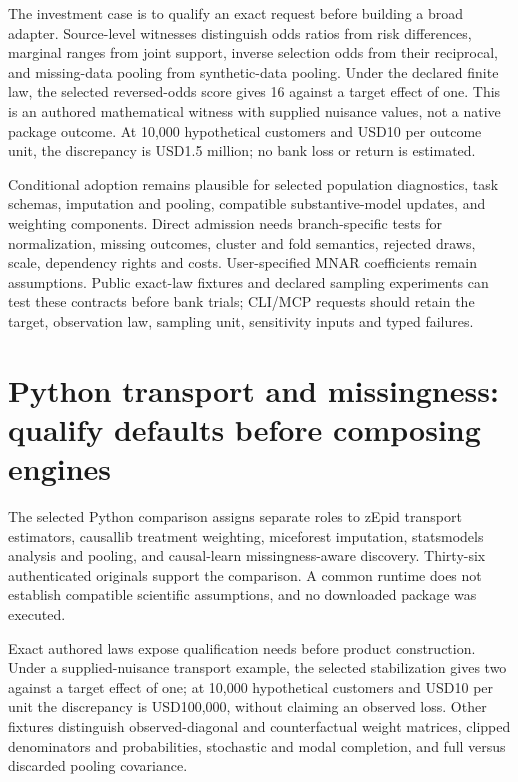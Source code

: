 The investment case is to qualify an exact request before building a
broad adapter. Source-level witnesses distinguish odds ratios from risk
differences, marginal ranges from joint support, inverse selection odds
from their reciprocal, and missing-data pooling from synthetic-data
pooling. Under the declared finite law, the selected reversed-odds score
gives 16 against a target effect of one. This is an authored
mathematical witness with supplied nuisance values, not a native package
outcome. At 10,000 hypothetical customers and USD10 per outcome unit,
the discrepancy is USD1.5 million; no bank loss or return is estimated.
\citep{exec25_rtm_choice}

Conditional adoption remains plausible for selected population
diagnostics, task schemas, imputation and pooling, compatible
substantive-model updates, and weighting components. Direct admission
needs branch-specific tests for normalization, missing outcomes, cluster
and fold semantics, rejected draws, scale, dependency rights and costs.
User-specified MNAR coefficients remain assumptions. Public exact-law
fixtures and declared sampling experiments can test these contracts
before bank trials; CLI/MCP requests should retain the target,
observation law, sampling unit, sensitivity inputs and typed failures.
\citep{exec25_rtm_choice}

\hypertarget{python-transport-and-missingness-qualify-defaults-before-composing-engines}{%
\section{Python transport and missingness: qualify defaults before
composing
engines}\label{python-transport-and-missingness-qualify-defaults-before-composing-engines}}

The selected Python comparison assigns separate roles to zEpid transport
estimators, causallib treatment weighting, miceforest imputation,
statsmodels analysis and pooling, and causal-learn missingness-aware
discovery. Thirty-six authenticated originals support the comparison. A
common runtime does not establish compatible scientific assumptions, and
no downloaded package was executed.
\citep{exec25_ptm_zepid,exec25_ptm_causallib,exec25_ptm_miceforest,exec25_ptm_statsmodels,exec25_ptm_causallearn}

Exact authored laws expose qualification needs before product
construction. Under a supplied-nuisance transport example, the selected
stabilization gives two against a target effect of one; at 10,000
hypothetical customers and USD10 per unit the discrepancy is USD100,000,
without claiming an observed loss. Other fixtures distinguish
observed-diagonal and counterfactual weight matrices, clipped
denominators and probabilities, stochastic and modal completion, and
full versus discarded pooling covariance. \citep{exec25_ptm_choice}

